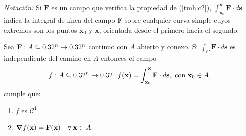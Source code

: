 \textit{Notación:} Si  $\mathbf{F}$ es un campo que verifica la propiedad de (\ref{tmh:c2}),   $\int_{\mathbf{x}_0}^{\mathbf{x}}\mathbf{F}\cdot d\mathbf{s}$ indica la integral de l\'inea del campo $\mathbf{F}$  sobre cualquier curva simple cuyos extremos son los puntos $\mathbf{x}_0$  y $\mathbf{x}$,  orientada desde el primero hacia el segundo.

\begin{theorem}\label{tmh:t2}
   Sea  $\mathbf{F}:A\subseteq0.32^n \to 0.32^n$ continuo con  $A$ abierto y conexo. Si  $\int_C \mathbf{F}\cdot d\mathbf{s}$ es independiente del camino en $A$  entonces el campo
    $$f:A\subseteq0.32^n\to0.32\: | \:f(\mathbf{x})=\int_{\mathbf{x}_0}^{\mathbf{x}}\mathbf{F}\cdot d\mathbf{s},  \mbox{ con }  \mathbf{x}_0\in A, $$
    cumple que: 
    \begin{enumerate}
        \item $f$ es $\mathcal{C}^1$.
        \item $\grad f(\mathbf{x})=\mathbf{F}(\mathbf{x})\quad\forall\:\mathbf{x}\in A.$
    \end{enumerate}
\end{theorem}

